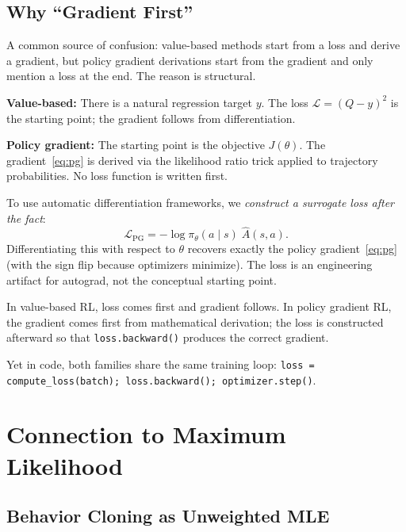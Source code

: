 \subsection{Why ``Gradient First''}

A common source of confusion: value-based methods start from a loss and derive a gradient, but policy gradient derivations start from the gradient and only mention a loss at the end. The reason is structural.

\textbf{Value-based:} There is a natural regression target $y$. The loss $\mathcal{L} = (Q - y)^2$ is the starting point; the gradient follows from differentiation.

\textbf{Policy gradient:} The starting point is the objective $J(\theta)$. The gradient~\eqref{eq:pg} is derived via the likelihood ratio trick applied to trajectory probabilities. No loss function is written first.

To use automatic differentiation frameworks, we \emph{construct a surrogate loss after the fact}:
\begin{equation}
  \mathcal{L}_{\text{PG}} = -\log\pi_\theta(a\mid s)\;\hat{A}(s,a).
  \label{eq:pg-loss}
\end{equation}
Differentiating this with respect to $\theta$ recovers exactly the policy gradient~\eqref{eq:pg} (with the sign flip because optimizers minimize). The loss is an engineering artifact for autograd, not the conceptual starting point.

\begin{keyidea}
In value-based RL, loss comes first and gradient follows. In policy gradient RL, the gradient comes first from mathematical derivation; the loss is constructed afterward so that \texttt{loss.backward()} produces the correct gradient.
\end{keyidea}

Yet in code, both families share the same training loop: \texttt{loss = compute\_loss(batch); loss.backward(); optimizer.step()}.

\section{Connection to Maximum Likelihood}
\label{sec:mle-connection}

\subsection{Behavior Cloning as Unweighted MLE}

